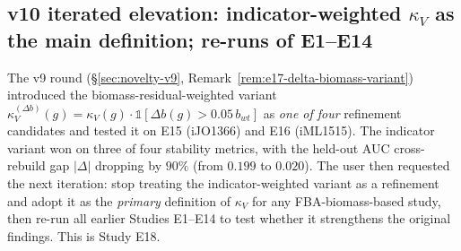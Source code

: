 \documentclass[11pt,a4paper]{article}
\theoremstyle{plain}
\theoremstyle{definition}
\theoremstyle{remark}
\begin{document}
\subsection{v10 iterated elevation: indicator-weighted $\kappa_V$
as the main definition; re-runs of E1--E14}\label{sec:novelty-v10}

The v9 round (\S\ref{sec:novelty-v9}, Remark~\ref{rem:e17-delta-biomass-variant})
introduced the biomass-residual-weighted variant
$\kappa_V^{(\Delta b)}(g) = \kappa_V(g)\cdot\mathbb{1}[\Delta b(g) > 0.05\,b_{wt}]$
as \emph{one of four} refinement candidates and tested it on E15 (iJO1366)
and E16 (iML1515). The indicator variant won on three of four stability
metrics, with the held-out AUC cross-rebuild gap $|\Delta|$ dropping by
$90\%$ (from $0.199$ to $0.020$). The user then requested the next
iteration: stop treating the indicator-weighted variant as a refinement
and adopt it as the \emph{primary} definition of $\kappa_V$ for any
FBA-biomass-based study, then re-run all earlier Studies E1--E14 to
test whether it strengthens the original findings. This is Study E18.
\end{document}
